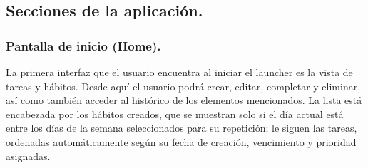 \subsection{Secciones de la aplicación.}

\subsubsection{Pantalla de inicio (Home).}

La primera interfaz que el usuario encuentra al iniciar el launcher es la vista de tareas y hábitos. Desde aquí el usuario podrá crear, editar, completar y eliminar, así como también acceder al histórico de los elementos mencionados. La lista está encabezada por los hábitos creados, que se muestran solo si el día actual está entre los días de la semana seleccionados para su repetición; le siguen las tareas, ordenadas automáticamente según su fecha de creación, vencimiento y prioridad asignadas.

